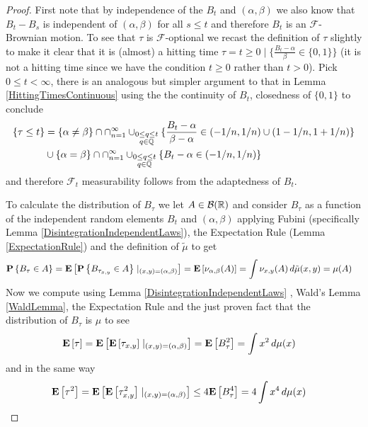 \begin{proof}
First note that by independence of the $B_t$ and $(\alpha, \beta)$ we
also know that $B_t -B_s$ is independent of $(\alpha, \beta)$ for all
$s \leq t$ and therefore $B_t$ is an $\mathcal{F}$-Brownian motion.
To see that $\tau$ is $\mathcal{F}$-optional we recast the definition
of $\tau$ slightly to make it clear that it is (almost) a hitting time
$\tau = t \geq 0 \mid \lbrace \frac{B_t - \alpha}{\beta} \in
\lbrace 0, 1\rbrace \rbrace$ (it is not a hitting time since we have
the condition $t\geq 0$ rather than $t>0$).  Pick $0 \leq t < \infty$,
there is an analogous but
simpler argument to that in 
Lemma \ref{HittingTimesContinuous}  using the the continuity of $B_t$,
closedness of $\lbrace 0, 1\rbrace$ to conclude
\begin{align*}
\lbrace \tau \leq t \rbrace &= \lbrace \alpha \neq \beta \rbrace \cap
\cap_{n=1}^\infty 
\cup_{\substack{0 \leq q \leq  t \\ q \in \mathbb{Q}} }
\lbrace \frac{B_t - \alpha}{\beta - \alpha} \in (-1/n,1/n) \cup
(1-1/n, 1+1/n) \rbrace \\
&\cup  \lbrace \alpha = \beta \rbrace \cap \cap_{n=1}^\infty 
\cup_{\substack{0 \leq q \leq  t \\ q \in \mathbb{Q}} }
\lbrace B_t - \alpha \in (-1/n,1/n) \rbrace 
\end{align*}
and therefore $\mathcal{F}_t$ measurability follows from the
adaptedness of $B_t$.

To calculate the distribution of $B_\tau$ we let $A \in
\mathcal{B}(\mathbb{R})$ and consider $B_\tau$ as a function of the
independent random elements $B_t$ and $(\alpha, \beta)$ applying
Fubini (specifically Lemma \ref{DisintegrationIndependentLaws}), the
Expectation Rule (Lemma \ref{ExpectationRule}) and the definition of
$\tilde{\mu}$ to get
\begin{align*}
\textbf{P}\left \{B_\tau \in A \right \} &=
\textbf{E}\left[\textbf{P}\left \{B_{\tau_{x,y}} \in A \right \}\mid_{(x,y)=(\alpha,
    \beta)}\right] = \textbf{E}\left[ \nu_{\alpha, \beta} (A)\right] = \int
\nu_{x,y}(A) \, d\tilde{\mu}(x,y) = \mu(A)
\end{align*}
Now we compute using Lemma \ref{DisintegrationIndependentLaws} , Wald's Lemma \ref{WaldLemma}, the
Expectation Rule and the
just proven fact that the distribution of $B_\tau$ is $\mu$ to see
\begin{align*}
\textbf{E}\left[\tau\right] &= \textbf{E}\left[\textbf{E}\left[\tau_{x,y}\right]\mid_{(x,y)
    = (\alpha, \beta)}\right] = \textbf{E}\left[B_\tau^2\right] = \int x^2 \, d\mu(x)
\end{align*}
and in the same way
\begin{align*}
\textbf{E}\left[\tau^2\right] &=  \textbf{E}\left[\textbf{E}\left[\tau_{x,y}^2\right]\mid_{(x,y)
    = (\alpha, \beta)}\right] \leq 4\textbf{E}\left[B^4_\tau\right] = 4\int x^4 \, d\mu(x)
\end{align*}
\end{proof}

